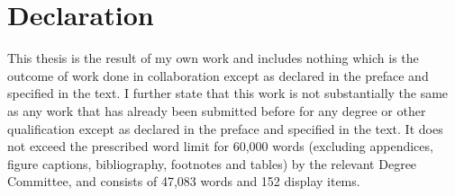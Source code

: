 \chapter{Declaration}
This thesis is the result of my own work and includes nothing which is the outcome of work done in collaboration except as declared in the preface and specified in the text. I further state that this work is not substantially the same as any work that has already been submitted before for any degree or other qualification except as declared in the preface and specified in the text. It does not exceed the prescribed word limit for 60,000 words (excluding appendices, figure captions, bibliography, footnotes and tables) by the relevant Degree Committee, and consists of 47,083 words and 152 display items.


